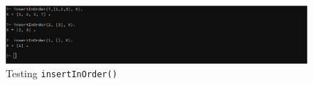 \documentclass[a4paper]{article}
\begin{document}
\begin{figure}[H]
    \includegraphics[width=\textwidth]{./images/q6.png}
    \caption{Testing \texttt{insertInOrder()}}
\end{figure}
\end{document}
